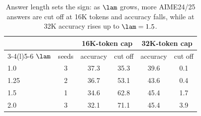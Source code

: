 \begin{table}[t]
\centering\small
\setlength{\tabcolsep}{4pt}
\begin{tabular}{@{}l c cc cc@{}}
\toprule
 & & \multicolumn{2}{c}{16K-token cap} & \multicolumn{2}{c}{32K-token cap} \\
\cmidrule(lr){3-4}\cmidrule(l){5-6}
$\lam$ & seeds & accuracy & cut off & accuracy & cut off \\
\midrule
1.0 & 3 & 37.3 & 35.3 & 39.6 & 0.1 \\
1.25 & 2 & 36.7 & 53.1 & 43.6 & 0.4 \\
1.5 & 1 & 34.6 & 62.8 & 45.4 & 1.7 \\
2.0 & 3 & 32.1 & 71.1 & 45.4 & 3.9 \\
\bottomrule
\end{tabular}
\caption{Answer length sets the sign: as $\lam$ grows, more AIME24/25 answers are cut off at 16K tokens and accuracy falls, while at 32K accuracy rises up to $\lam=1.5$.}
\label{tab:mathcap}
\end{table}
